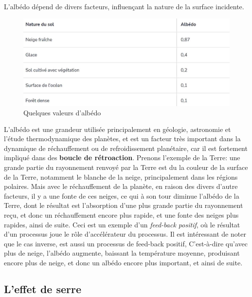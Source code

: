 \documentclass[11pt,a4paper]{article}
\begin{document}
L'albédo dépend de divers facteurs, influençant la nature de la surface incidente. 
\vspace{0.5cm}
\begin{figure}[h]
    \centering
    \includegraphics[width=0.8\linewidth]{imgs/p4/albedotable.jpg}
    \caption{Quelques valeurs d'albédo}
\end{figure}
\vspace{1cm}
\begin{rmrq}
L'albédo est une grandeur utilisée principalement en géologie, astronomie et l'étude thermodynamique des planètes, et est un facteur très important dans la dynamique de réchauffement ou de refroidissement planétaire, car il est fortement impliqué dans des \textbf{boucle de rétroaction}. Prenons l'exemple de la Terre: une grande partie du rayonnement renvoyé par la Terre est du la couleur de la surface de la Terre, notamment le blanche de la neige, principalement dans les régions polaires. Mais avec le réchauffement de la planète, en raison des divers d'autre facteurs, il y a une fonte de ces neiges, ce qui à son tour diminue l'albédo de la Terre, dont le résultat est l'absorption d'une plus grande partie du rayonnement reçu, et donc un réchauffement encore plus rapide, et une fonte des neiges plus rapides, ainsi de suite. Ceci est un exemple d'un \textit{feed-back positif}, où le résultat d'un processus joue le rôle d'accélérateur du processus. Il est intéressant de noter que le cas inverse, est aussi un processus de feed-back positif, C'est-à-dire qu'avec plus de neige, l'albédo augmente, baissant la température moyenne, produisant encore plus de neige, et donc un albédo encore plus important, et ainsi de suite. 
\end{rmrq}


\subsection{L'effet de serre}
\end{document}
